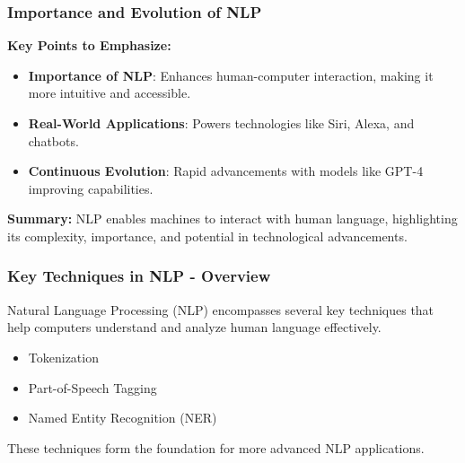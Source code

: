 \documentclass[aspectratio=169]{beamer}
\begin{document}
\begin{frame}[fragile]
    \frametitle{Importance and Evolution of NLP}
    
    \textbf{Key Points to Emphasize:}
    \begin{itemize}
        \item \textbf{Importance of NLP}: Enhances human-computer interaction, making it more intuitive and accessible.
        \item \textbf{Real-World Applications}: Powers technologies like Siri, Alexa, and chatbots.
        \item \textbf{Continuous Evolution}: Rapid advancements with models like GPT-4 improving capabilities.
    \end{itemize}
    
    \textbf{Summary:} 
    NLP enables machines to interact with human language, highlighting its complexity, importance, and potential in technological advancements.
\end{frame}

\begin{frame}[fragile]
    \frametitle{Key Techniques in NLP - Overview}
    Natural Language Processing (NLP) encompasses several key techniques that help computers understand and analyze human language effectively. 
    \begin{itemize}
        \item Tokenization
        \item Part-of-Speech Tagging
        \item Named Entity Recognition (NER)
    \end{itemize}
    These techniques form the foundation for more advanced NLP applications.
\end{frame}
\end{document}

